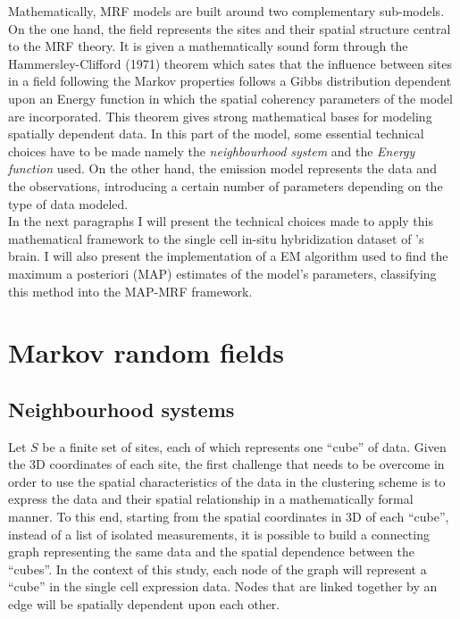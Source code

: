 	 Mathematically, MRF models are built around two complementary sub-models. On the one hand, the field represents the sites and their spatial structure central to the MRF theory. It is given a mathematically sound form through the Hammersley-Clifford (1971) theorem which sates that the influence between sites in a field following the Markov properties follows a Gibbs distribution dependent upon an Energy function in which the spatial coherency parameters of the model are incorporated. This theorem gives strong mathematical bases for modeling spatially dependent data. In this part of the model, some essential technical choices have to be made namely the \emph{neighbourhood system} and the \emph{Energy function} used. On the other hand, the emission model represents the data and the observations, introducing a certain number of parameters depending on the type of data modeled.\\
	 
	 In the next paragraphs I will present the technical choices made to apply this mathematical framework to the single cell in-situ hybridization dataset of \platy{}'s brain. I will also present the implementation of a EM algorithm used to find the maximum a posteriori (MAP) estimates of the model's parameters, classifying this method into the MAP-MRF framework.

\section{Markov random fields}
	

	\subsection{Neighbourhood systems}\label{sec:neighbours}
Let $S$ be a finite set of sites, each of which represents one ``cube'' of data. Given the 3D coordinates of each site, the first challenge that needs to be overcome in order to use the spatial characteristics of the data in the clustering scheme is to express the data and their spatial relationship in a mathematically formal manner. To this end, starting from the spatial coordinates in 3D of each ``cube'', instead of a list of isolated measurements, it is possible to build a connecting graph representing the same data and the spatial dependence between the ``cubes''. In the context of this study, each node of the graph will represent a ``cube'' in the single cell expression data. Nodes that are linked together by an edge will be spatially dependent upon each other.\\

